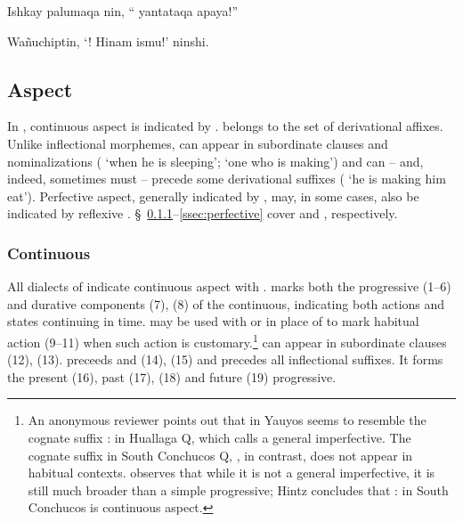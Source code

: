 %
{Ishkay palumaqa nin, ``\textexclamdown{} yantataqa apaya!''}%
{}%
{}{}%

%
{Wa\~nuchiptin, `\textexclamdown{}! \textexclamdown{}Hinam ismu!' ninshi.}%
{}%
{}{}%

\subsection{Aspect}\label{ssec:aspect}
In \SYQ{}, continuous aspect is indicated by .  belongs to the set of derivational affixes. Unlike inflectional morphemes,  can appear in subordinate clauses and nominalizations ( `when he is sleeping';  `one who is making') and can -- and, indeed, sometimes must -- precede some derivational suffixes ( `he is making him eat'). Perfective aspect, generally indicated by , may, in some cases, also be indicated by reflexive . \S~\ref{ssec:progressive}--\ref{ssec:perfective} cover  and , respectively.

\subsubsection{Continuous }\label{ssec:progressive}
All dialects of \SYQ{} indicate continuous aspect with .  marks both the progressive (1--6) and durative components (7), (8) of the continuous, indicating both actions and states continuing in time.  may be used with or in place of  to mark habitual action (9--11) when such action is customary.\footnote{An anonymous reviewer points out that  in Yauyos seems to resemble the cognate suffix : in Huallaga Q, which \citet{Weber89} calls a general imperfective. The cognate suffix in South Conchucos Q, , in contrast, does not appear in habitual contexts. \citet{Hintz} observes that while it is not a general imperfective, it is still much broader than a simple progressive; Hintz concludes that : in South Conchucos is continuous aspect.}  can appear in subordinate clauses (12), (13).  preceeds  and  (14), (15) and precedes all inflectional suffixes. It forms the present (16), past (17), (18) and future (19) progressive.

